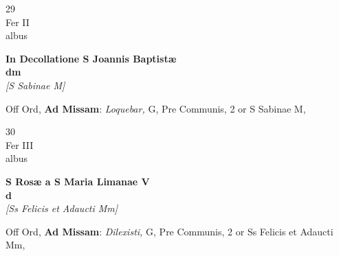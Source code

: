 \documentclass[10pt, openany]{book}
\begin{document}
        \begin{center}
            \begin{minipage}{3.5in}
                \vspace{2em}
                \begin{minipage}{0.5in}
                    {\Huge 29} \\
                    {\normalsize Fer II} \\
                    {\normalsize albus}
                \end{minipage}
                \begin{minipage}{3.0in}
                    \textbf{ \large In Decollatione S Joannis Baptistæ \\
                    \textnormal{\normalsize dm}} \\ \textit{[S Sabinae M]} \\ 
                \end{minipage}
                \begin{justify}Off Ord, \textbf{Ad Missam}: \textit{Loquebar,} G, Pre Communis, 2 or S Sabinae M,   
                \end{justify}
            \end{minipage}
        \end{center}
    
        \begin{center}
            \begin{minipage}{3.5in}
                \vspace{2em}
                \begin{minipage}{0.5in}
                    {\Huge 30} \\
                    {\normalsize Fer III} \\
                    {\normalsize albus}
                \end{minipage}
                \begin{minipage}{3.0in}
                    \textbf{ \large S Rosæ a S Maria Limanae V \\
                    \textnormal{\normalsize d}} \\ \textit{[Ss Felicis et Adaucti Mm]} \\ 
                \end{minipage}
                \begin{justify}Off Ord, \textbf{Ad Missam}: \textit{Dilexisti,} G, Pre Communis, 2 or Ss Felicis et Adaucti Mm,   
                \end{justify}
            \end{minipage}
        \end{center}
    
\end{document}
